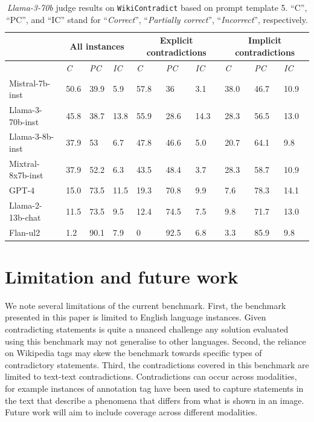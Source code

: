 \documentclass{article}
\begin{document}
\begin{table}[h]
    \centering

    \caption{\emph{Llama-3-70b} judge results on \texttt{WikiContradict} based on prompt template 5. ``C'', ``PC'', and ``IC'' stand for ``\emph{Correct}'', ``\emph{Partially correct}'', ``\emph{Incorrect}'', respectively.}
    \label{tab:auto_eval_all}
    \begin{small}
    \begin{tabular}{|l|p{0.7cm}|p{0.7cm}|p{0.7cm}|p{0.8cm}|p{0.8cm}|p{0.8cm}|p{0.8cm}|p{0.8cm}|p{0.8cm}|}
    \hline
        & \multicolumn{3}{c|}{\textbf{All instances}}& \multicolumn{3}{c|}{\textbf{Explicit contradictions }} & \multicolumn{3}{c|}{\textbf{Implicit contradictions}}\\ \hline
        ~ & \emph{C} & \emph{PC} & \emph{IC} & \emph{C} & \emph{PC} & \emph{IC} & \emph{C} & \emph{PC} & \emph{IC}\\ \hline
        Mistral-7b-inst& 50.6 & 39.9 & 5.9 & 57.8 & 36 & 3.1 & 38.0 & 46.7 & 10.9 \\ \hline
        Llama-3-70b-inst & 45.8 & 38.7 & 13.8 & 55.9 & 28.6 & 14.3 & 28.3 & 56.5 & 13.0 \\ \hline
        Llama-3-8b-inst & 37.9 & 53 & 6.7 & 47.8 & 46.6 & 5.0 & 20.7 & 64.1 & 9.8 \\ \hline
        Mixtral-8x7b-inst & 37.9 & 52.2 & 6.3 & 43.5 & 48.4 & 3.7 & 28.3 & 58.7 & 10.9 \\ \hline
        GPT-4 & 15.0 & 73.5 & 11.5 & 19.3 & 70.8 & 9.9 & 7.6 & 78.3 & 14.1 \\ \hline
        Llama-2-13b-chat & 11.5 & 73.5 & 9.5 & 12.4 & 74.5 & 7.5 & 9.8 & 71.7 & 13.0 \\ \hline
        Flan-ul2 & 1.2 & 90.1 & 7.9 & 0 & 92.5 & 6.8 & 3.3 & 85.9 & 9.8 \\ \hline    \end{tabular}
     \end{small}
\end{table}



\section{Limitation and future work} 
\label{sec:limit}
We note several limitations of the current benchmark. First, the benchmark presented in this paper is limited to English language instances. Given contradicting statements is quite a nuanced challenge any solution evaluated using this benchmark may not generalise to other languages. Second, the reliance on Wikipedia tags may skew the benchmark towards specific types of contradictory statements. Third, the contradictions covered in this benchmark are limited to text-text contradictions. Contradictions can occur across modalities, for example instances of annotation tag have been used to capture statements in the text that describe a phenomena that differs from what is shown in an image. Future work will aim to include coverage across different modalities. 
\end{document}

